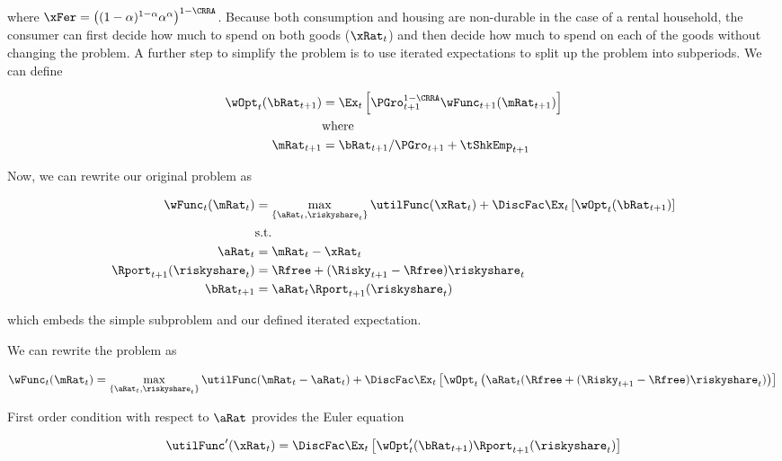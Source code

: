 \documentclass[PortfolioChoiceWithRiskyHousing]{subfiles}
\begin{document}
where $\xFer = \left( (1-\alpha)^{1-\alpha}\alpha^{\alpha} \right)^{1-\CRRA}$. Because both consumption and housing are non-durable in the case of a rental household, the consumer can first decide how much to spend on both goods ($\xRat_{t}$) and then decide how much to spend on each of the goods without changing the problem. A further step to simplify the problem is to use iterated expectations to split up the problem into subperiods. We can define

\begin{equation}
	\begin{split}
		\wOpt_{t}(\bRat_{t+1}) & = \Ex_{t}\left[ \PGro_{t+1}^{1-\CRRA} \wFunc_{t+1}(\mRat_{t+1}) \right] \\
		& \text{where} \\
		\mRat_{t+1} & = \bRat_{t+1}/\PGro_{t+1} + \tShkEmp_{t+1}
	\end{split}
\end{equation}

Now, we can rewrite our original problem as

\begin{equation}
	\begin{split}
		\wFunc_{t}(\mRat_{t}) & = \max_{\{\aRat_{t}, \riskyshare_{t}\}} \utilFunc(\xRat_{t}) + \DiscFac \Ex_{t} \left[ \wOpt_{t}(\bRat_{t+1}) \right] \\
		& \text{s.t.} \\
		\aRat_{t} & = \mRat_{t} - \xRat_{t} \\
		\Rport_{t+1}(\riskyshare_{t}) & = \Rfree + (\Risky_{t+1} - \Rfree)\riskyshare_{t} \\
		\bRat_{t+1} & = \aRat_{t}\Rport_{t+1}(\riskyshare_{t})
	\end{split}
\end{equation}

which embeds the simple subproblem and our defined iterated expectation.

We can rewrite the problem as

\begin{equation}
	\wFunc_{t}(\mRat_{t}) = \max_{\{\aRat_{t}, \riskyshare_{t}\}} \utilFunc(\mRat_{t} - \aRat_{t}) + \DiscFac \Ex_{t} \left[ \wOpt_{t}\left( \aRat_{t}(\Rfree + (\Risky_{t+1} - \Rfree)\riskyshare_{t}) \right) \right] \\
\end{equation}

First order condition with respect to $\aRat$ provides the Euler equation

\begin{equation}
	\utilFunc'(\xRat_{t}) = \DiscFac \Ex_{t} \left[ \wOpt_{t}'(\bRat_{t+1})\Rport_{t+1}(\riskyshare_{t}) \right]
\end{equation}
\end{document}
